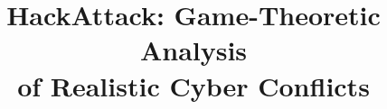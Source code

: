 \documentclass{sig-alternate}
\begin{document}
%

\title{HackAttack: Game-Theoretic Analysis\\
of Realistic Cyber Conflicts%
}


%
%
%
%
%
\end{document}
